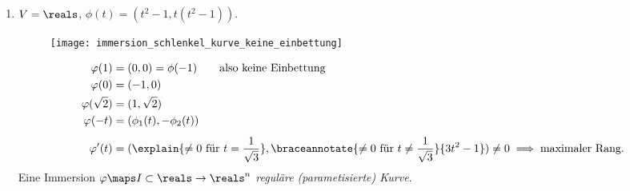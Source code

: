 \begin{beispiele*}
  \begin{enumerate}[label=\rechtsklammer{\roman*}]
    \item \label{immersion_beispiel:schlenkel_kurve} \( V=\reals \), \( \phi(t)=(t^2-1,t(t^2-1)) \). 
    \begin{figure}[H]
      \centering
      \texttt{[image: immersion\_schlenkel\_kurve\_keine\_einbettung]}
      \label{fig:immersion_schlenkel_kurve_keine_einbettung}
    \end{figure}
    \begin{align*}
      \varphi(1)&=(0,0)=\phi(-1)\qquad \text{also keine Einbettung}\\
      \varphi(0)&=(-1,0)\\
      \varphi(\sqrt{2})&=(1,\sqrt{2})\\
      \varphi(-t)&=(\phi_1(t),-\phi_2(t))\\[1ex]
      \varphi'(t)&=(\explain{\neq 0 \text{ für } t=\frac{1}{\sqrt{3}}},\braceannotate{\neq 0 \text{ für }t\neq \frac{1}{\sqrt{3}}}{3t^2-1})\neq 0\implies \text{maximaler Rang}.
    \end{align*}
    Eine Immersion \( \varphi\maps I\subset \reals\to \reals^n \) \emph{reguläre (parametisierte) Kurve}.
    

\end{enumerate}
\end{beispiele*}
